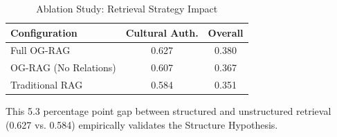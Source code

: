 \begin{table}[h]
\centering
\caption{Ablation Study: Retrieval Strategy Impact}
\label{tab:ablation}
\begin{tabular}{lcc}
\toprule
\textbf{Configuration} & \textbf{Cultural Auth.} & \textbf{Overall} \\
\midrule
Full OG-RAG            & 0.627 & 0.380 \\
OG-RAG (No Relations)  & 0.607 & 0.367 \\
Traditional RAG        & 0.584 & 0.351 \\
\bottomrule
\end{tabular}
\end{table}

This 5.3 percentage point gap between structured and unstructured retrieval (0.627 vs. 0.584) empirically validates the Structure Hypothesis.
